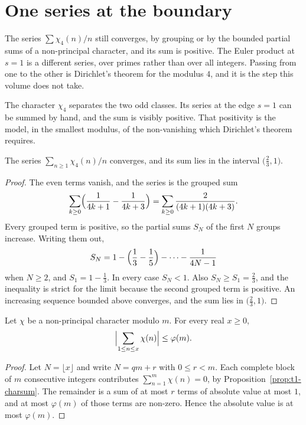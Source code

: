 \section{One series at the boundary}

The series $\sum\chi_4(n)/n$ still converges, by grouping or by the bounded partial sums of a non-principal character, and its sum is positive. The Euler product at $s=1$ is a different series, over primes rather than over all integers. Passing from one to the other is Dirichlet's theorem for the modulus $4$, and it is the step this volume does not take.

The character $\chi_4$ separates the two odd classes. Its series at the edge $s=1$ can be summed by hand, and the sum is visibly positive. That positivity is the model, in the smallest modulus, of the non-vanishing which Dirichlet's theorem requires.

\begin{proposition}\label{prop:t1-chi4series}
The series $\sum_{n\ge1}\chi_4(n)/n$ converges, and its sum lies in the interval $\bigl(\frac23,1\bigr)$.
\end{proposition}
\begin{proof}
The even terms vanish, and the series is the grouped sum
\[
\sum_{k\ge0}\Bigl(\frac1{4k+1}-\frac1{4k+3}\Bigr)
=\sum_{k\ge0}\frac2{(4k+1)(4k+3)}.
\]
Every grouped term is positive, so the partial sums $S_N$ of the first $N$ groups increase. Writing them out,
\[
S_N=1-\Bigl(\frac13-\frac15\Bigr)-\cdots-\frac1{4N-1}
\]
when $N\ge2$, and $S_1=1-\frac13$. In every case $S_N<1$. Also $S_N\ge S_1=\frac23$, and the inequality is strict for the limit because the second grouped term is positive. An increasing sequence bounded above converges, and the sum lies in $\bigl(\frac23,1\bigr)$.
\end{proof}

\begin{proposition}\label{prop:t1-charbound}
Let $\chi$ be a non-principal character modulo $m$. For every real $x\ge0$,
\[
\Bigl|\sum_{1\le n\le x}\chi(n)\Bigr|\le\varphi(m).
\]
\end{proposition}
\begin{proof}
Let $N=\lfloor x\rfloor$ and write $N=qm+r$ with $0\le r<m$. Each complete block of $m$ consecutive integers contributes $\sum_{n=1}^m\chi(n)=0$, by Proposition~\ref{prop:t1-charsum}. The remainder is a sum of at most $r$ terms of absolute value at most $1$, and at most $\varphi(m)$ of those terms are non-zero. Hence the absolute value is at most $\varphi(m)$.
\end{proof}

